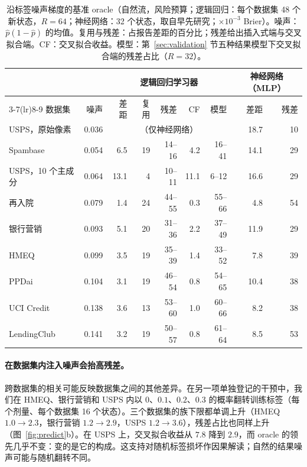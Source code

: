 \documentclass[runningheads]{llncs}
\begin{document}
\begin{table}[t]
\caption{沿标签噪声梯度的基准 oracle（自然流，风险预算；逻辑回归：每个数据集 48 个新状态，$R=64$；神经网络：32 个状态，取自早先研究；$\times10^{-3}$ Brier）。噪声：$\hat p(1-\hat p)$ 的均值。复用与残差：占报告差距的百分比；残差给出插入式端与交叉拟合端。CF：交叉拟合收益。模型：第~\ref{sec:validation} 节五种结果模型下交叉拟合端的残差占比（$R=32$）。}
\label{tab:gradient}
\centering\scriptsize
\setlength{\tabcolsep}{2.8pt}
\begin{tabular}{lrrrrrrrr}
\toprule
& & \multicolumn{5}{c}{逻辑回归学习器} & \multicolumn{2}{c}{神经网络（MLP）} \\
\cmidrule(lr){3-7}\cmidrule(lr){8-9}
数据集 & 噪声 & 差距 & 复用 & 残差 & CF & 模型 & 差距 & 残差 \\
\midrule
USPS，原始像素 & 0.036 & \multicolumn{5}{c}{（仅神经网络）} & 18.7 & 10 \\
Spambase & 0.054 & 6.5 & 19 & 14--16 & 4.2 & 16--41 & 14.1 & 29 \\
USPS，10 个主成分 & 0.064 & 13.1 & 4 & 10--11 & 11.1 & 6--12 & 16.6 & 29 \\
再入院 & 0.079 & 1.4 & 24 & 44--55 & 0.3 & 55--66 & 4.8 & 54 \\
银行营销 & 0.093 & 5.1 & 20 & 31--36 & 2.2 & 37--49 & 11.9 & 29 \\
HMEQ & 0.099 & 3.5 & 19 & 35--39 & 1.4 & 33--52 & 7.8 & 39 \\
PPDai & 0.104 & 3.1 & 19 & 46--54 & 0.8 & 54--65 & 10.4 & 38 \\
UCI Credit & 0.138 & 3.6 & 13 & 53--60 & 1.0 & 60--66 & 8.2 & 38 \\
LendingClub & 0.141 & 3.2 & 19 & 50--57 & 0.8 & 61--64 & 8.5 & 53 \\
\bottomrule
\end{tabular}
\end{table}

\paragraph{在数据集内注入噪声会抬高残差。}跨数据集的相关可能反映数据集之间的其他差异。在另一项单独登记的干预中，我们在 HMEQ、银行营销和 USPS 内以 $0$、$0.1$、$0.2$、$0.3$ 的概率翻转训练标签（每个剂量、每个数据集 16 个状态）。三个数据集的族下限都单调上升（HMEQ $1.0\to2.3$，银行营销 $1.2\to2.9$，USPS $1.2\to3.6$），残差占比也同样上升（图~\ref{fig:predict}b）。在 USPS 上，交叉拟合收益从 $7.8$ 降到 $2.9$，而 oracle 的领先几乎不变：变的是它的构成。这支持对随机标签损坏作因果解读；自然的结果噪声可能与随机翻转不同。
\end{document}
